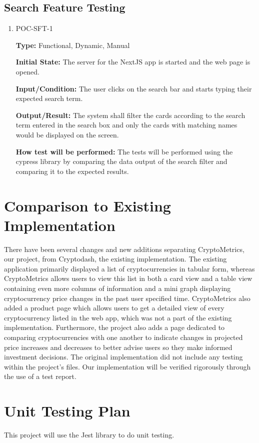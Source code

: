 \documentclass[12pt, titlepage]{article}
\begin{document}
\subsection{Search Feature Testing}
\begin{enumerate}
\item{POC-SFT-1}


\textbf{Type:} Functional, Dynamic, Manual
					
\textbf{Initial State:} The server for the NextJS app is started and the web page is opened.
					
\textbf{Input/Condition:} The user clicks on the search bar and starts typing their expected search term.
					
\textbf{Output/Result:} The system shall filter the cards according to the search term entered in the search box and only the cards with matching names would be displayed on the screen.
					
\textbf{How test will be performed:} The tests will be performed using the cypress library by comparing the data output of the search filter and comparing it to the expected results. 
\end{enumerate}
	
\section{Comparison to Existing Implementation}	

There have been several changes and new additions separating CryptoMetrics, our project, from Cryptodash, the existing implementation. The existing application primarily displayed a list of cryptocurrencies in tabular form, whereas CryptoMetrics allows users to view this list in both a card view and a table view containing even more columns of information and a mini graph displaying cryptocurrency price changes in the past user specified time. CryptoMetrics also added a product page which allows users to get a detailed view of every cryptocurrency listed in the web app, which was not a part of the existing implementation. Furthermore, the project also adds a page dedicated to comparing cryptocurrencies with one another to indicate changes in projected price increases and decreases to better advise users so they make informed investment decisions. The original implementation did not include any testing within the project's files. Our implementation will be verified rigorously through the use of a test report.
\newpage
\section{Unit Testing Plan}
This project will use the Jest library to do unit testing.	
\end{document}
